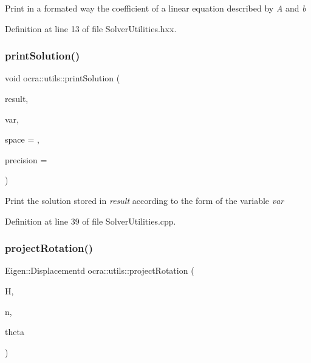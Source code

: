 Print in a formated way the coefficient of a linear equation described by {\itshape A} and {\itshape b} 

Definition at line 13 of file Solver\+Utilities.\+hxx.

\hypertarget{namespaceocra_1_1utils_aa928598a03da10c32b029f77c571788a}{}\label{namespaceocra_1_1utils_aa928598a03da10c32b029f77c571788a} 
\subsubsection{\texorpdfstring{print\+Solution()}{printSolution()}}
{\footnotesize\ttfamily void ocra\+::utils\+::print\+Solution (\begin{DoxyParamCaption}\item[{const Vector\+Xd \&}]{result,  }\item[{const \hyperlink{classocra_1_1Variable}{Variable} \&}]{var,  }\item[{int}]{space = {},  }\item[{int}]{precision = {} }\end{DoxyParamCaption})}

Print the solution stored in {\itshape result} according to the form of the variable {\itshape var} 

Definition at line 39 of file Solver\+Utilities.\+cpp.

\hypertarget{namespaceocra_1_1utils_a0c4be9b19e14fb7dfb9ae92650267dba}{}\label{namespaceocra_1_1utils_a0c4be9b19e14fb7dfb9ae92650267dba} 
\subsubsection{\texorpdfstring{project\+Rotation()}{projectRotation()}\hspace{0.1cm}{\footnotesize\ttfamily [1/2]}}
{\footnotesize\ttfamily Eigen\+::\+Displacementd ocra\+::utils\+::project\+Rotation (\begin{DoxyParamCaption}\item[{const Eigen\+::\+Displacementd \&}]{H,  }\item[{const Eigen\+::\+Vector3d \&}]{n,  }\item[{double \&}]{theta }\end{DoxyParamCaption})}

